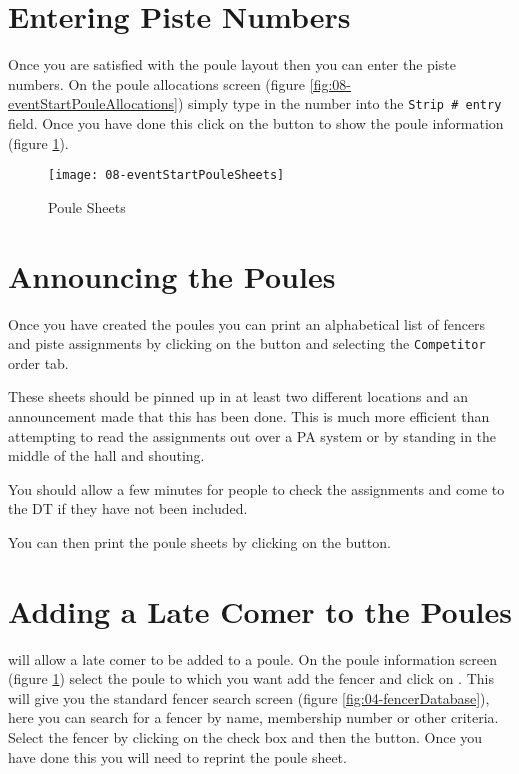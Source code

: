 \documentclass[a4paper,11pt]{memoir}
\begin{document}
\section{Entering Piste Numbers}

Once you are satisfied with the poule layout then you can enter the piste numbers. On the poule allocations screen (figure \ref{fig:08-eventStartPouleAllocations}) simply type in the number into the \texttt{Strip \# entry} field. Once you have done this click on the  button to show the poule information (figure \ref{fig:08-eventStartPouleSheets}).

\begin{figure}[!ht]
 \centering
 \texttt{[image: 08-eventStartPouleSheets]}
 \caption{Poule Sheets} \label{fig:08-eventStartPouleSheets}
\end{figure}

\section{Announcing the Poules}

Once you have created the poules you can print an alphabetical list of fencers and piste assignments by clicking on the  button and selecting the \texttt{Competitor} order tab. 

These sheets should be pinned up in at least two different locations and an announcement made that this has been done. This is much more efficient than attempting to read the assignments out over a PA system or by standing in the middle of the hall and shouting.

You should allow a few minutes for people to check the assignments and come to the DT if they have not been included. 

You can then print the poule sheets by clicking on the  button.

\section{Adding a Late Comer to the Poules}\label{sec:pouleLatecomer}

\fencingtime{} will allow a late comer to be added to a poule. On the poule information screen (figure \ref{fig:08-eventStartPouleSheets}) select the poule to which you want add the fencer and click on . This will give you the standard fencer search screen (figure \ref{fig:04-fencerDatabase}), here you can search for a fencer by name, membership number or other criteria. Select the fencer by clicking on the check box and then the  button. Once you have done this you will need to reprint the poule sheet. 
\end{document}
